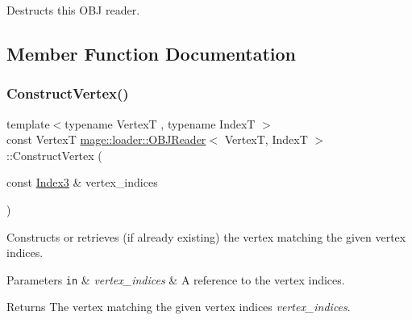 Destructs this O\+BJ reader. 

\subsection{Member Function Documentation}
\hypertarget{classmage_1_1loader_1_1_o_b_j_reader_ac78fe5537ba2d3098a9f0a8858893dd3}{}\label{classmage_1_1loader_1_1_o_b_j_reader_ac78fe5537ba2d3098a9f0a8858893dd3} 
\subsubsection{\texorpdfstring{Construct\+Vertex()}{ConstructVertex()}}
{\footnotesize\ttfamily template$<$typename VertexT , typename IndexT $>$ \\
const VertexT \hyperlink{classmage_1_1loader_1_1_o_b_j_reader}{mage\+::loader\+::\+O\+B\+J\+Reader}$<$ VertexT, IndexT $>$\+::Construct\+Vertex (\begin{DoxyParamCaption}\item[{const \hyperlink{classmage_1_1loader_1_1_o_b_j_reader_af9aab131e88c5a3a0f29b156c4c97096}{Index3} \&}]{vertex\+\_\+indices }\end{DoxyParamCaption})\hspace{0.3cm}{\ttfamily [private]}}

Constructs or retrieves (if already existing) the vertex matching the given vertex indices.


\begin{DoxyParams}[1]{Parameters}
\mbox{\tt in}  & {\em vertex\+\_\+indices} & A reference to the vertex indices. \\
\hline
\end{DoxyParams}
\begin{DoxyReturn}{Returns}
The vertex matching the given vertex indices {\itshape vertex\+\_\+indices}. 
\end{DoxyReturn}
\hypertarget{classmage_1_1loader_1_1_o_b_j_reader_a83f3553355ca35eada2267caebd6cbca}{}\label{classmage_1_1loader_1_1_o_b_j_reader_a83f3553355ca35eada2267caebd6cbca} 
